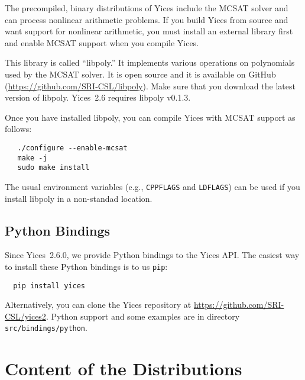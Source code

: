 \documentclass[11pt,twoside,fleqn,openright,titlepage]{cslreport}
\begin{document}
The precompiled, binary distributions of Yices include the MCSAT
solver and can process nonlinear arithmetic problems. If you build
Yices from source and want support for nonlinear arithmetic, you must
install an external library first and enable MCSAT support when you
compile Yices.

This library is called ``libpoly.'' It implements various operations
on polynomials used by the MCSAT solver. It is open source and it is
available on GitHub (\url{https://github.com/SRI-CSL/libpoly}). Make
sure that you download the latest version of libpoly. Yices~2.6
requires libpoly v0.1.3.

Once you have installed libpoly, you can compile Yices with MCSAT
support as follows:
\begin{small}
\begin{verbatim}
   ./configure --enable-mcsat
   make -j
   sudo make install
\end{verbatim}
\end{small}
The usual environment variables (e.g., \texttt{CPPFLAGS} and
\texttt{LDFLAGS}) can be used if you install libpoly in a non-standad
location.


\subsection{Python Bindings}
\label{python-bindings}

Since Yices~2.6.0, we provide Python bindings to the Yices API. The
easiest way to install these Python bindings is to us \texttt{pip}:
\begin{small}
\begin{verbatim}
  pip install yices
\end{verbatim}
\end{small}
Alternatively, you can clone the Yices repository at
\url{https://github.com/SRI-CSL/yices2}. Python support and some
examples are in directory \texttt{src/bindings/python}.


\section{Content of the Distributions}
\end{document}
